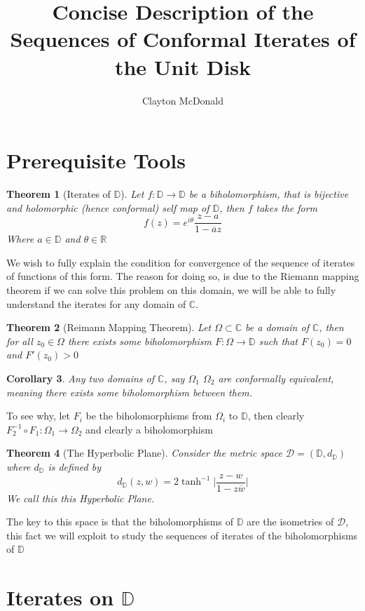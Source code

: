 \documentclass{article}
\title{Concise Description of the Sequences of Conformal Iterates of the Unit Disk}
\author{Clayton McDonald}
\newcommand{\R}{\mathbb{R}}
\newcommand{\C}{\mathbb{C}}
\newcommand{\D}{\mathbb{D}}
\newtheorem{theorem}{Theorem}
\newtheorem{corollary}[theorem]{Corollary}
\begin{document}
\maketitle
\section{Prerequisite Tools}

\begin{theorem}[Iterates of $\D$]
    Let $f:\D\to\D$ be a biholomorphism, that is bijective and holomorphic (hence conformal) self map of $\D$, then $f$ takes the form
    \begin{equation*}
        f(z) = e^{i\theta} \frac{z-a}{1-\overline{a}z}
    \end{equation*}
Where $a\in\D$ and $\theta\in\R$
\end{theorem}
We wish to fully explain the condition for convergence of the sequence of iterates of functions of this form.
The reason for doing so, is due to the Riemann mapping theorem if we can solve this problem on this domain, we will be able to fully understand
the iterates for any domain of $\C$. 
\begin{theorem}[Reimann Mapping Theorem]
Let $\Omega\subset\C$ be a domain of $\C$, then for all $z_0\in\Omega$ there exists some biholomorphism $F:\Omega\to\D$ such that $F(z_0) = 0$ and $F'(z_0)>0$
\end{theorem}
\begin{corollary}
    Any two domains of $\C$, say $\Omega_1$ $\Omega_2$ are conformally equivalent, meaning there exists some biholomorphism between them.
\end{corollary}
To see why, let $F_i$ be the biholomorphisms from $\Omega_i$ to $\D$, then clearly $F_2^{-1} \circ F_1:\Omega_1\to\Omega_2$ and clearly a biholomorphism \\ 
\begin{theorem}[The Hyperbolic Plane]
    Consider the metric space $\mathcal{D} = (\D, d_\D)$ where $d_\D$ is defined by
    \begin{equation*}
        d_\D (z, w) = 2 \tanh^{-1}\bigg|\frac{z-w}{1-z\overline{w}} \bigg|
    \end{equation*}
We call this this Hyperbolic Plane.
\end{theorem}
The key to this space is that the biholomorphisms of $\D$ are the isometries of $\mathcal{D}$, this fact we will exploit to study the sequences of iterates of the biholomorphisms of $\D$
\section{Iterates on $\D$}
\end{document}
